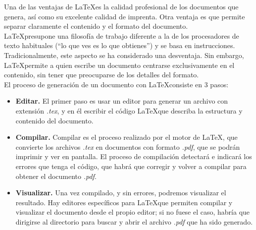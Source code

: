 \documentclass[a4paper, 12pt]{book}
\begin{document}
Una de las ventajas de \LaTeX es la calidad profesional de los documentos que genera, así como su excelente calidad de imprenta. Otra ventaja es que permite separar claramente el contenido y el formato del documento.\\

\LaTeX presupone una filosofía de trabajo diferente a la de los procesadores de texto habituales (``lo que ves es lo que obtienes'') y se basa en instrucciones. Tradicionalmente, este aspecto se ha considerado una desventaja. Sin embargo, \LaTeX permite a quien escribe un documento centrarse exclusivamente en el contenido, sin tener que preocuparse de los detalles del formato.\\

El proceso de generación de un documento con \LaTeX consiste en 3 pasos:
\begin{itemize}
	\item \textbf{Editar.} El primer paso es usar un editor para generar un archivo con extensión \textit{.tex}, y en él escribir el código \LaTeX que describa la estructura y contenido del documento.
	\item \textbf{Compilar.} Compilar es el proceso realizado por el motor de \LaTeX, que convierte los archivos \textit{.tex} en documentos con formato \textit{.pdf}, que se podrán imprimir y ver en pantalla. El proceso de compilación detectará e indicará los errores que tenga el código, que habrá que corregir y volver a compilar para obtener el documento \textit{.pdf}.
	\item \textbf{Visualizar.} Una vez compilado, y sin errores, podremos visualizar el resultado. Hay editores específicos para \LaTeX que permiten compilar y visualizar el documento desde el propio editor; si no fuese el caso, habría que dirigirse al directorio para buscar y abrir el archivo \textit{.pdf} que ha sido generado.
\end{itemize}
\end{document}
